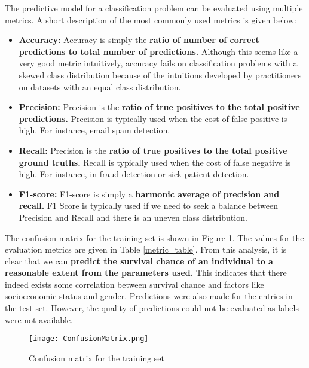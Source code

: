 \documentclass[conference]{IEEEtran}
\begin{document}
The predictive model for a classification problem can be evaluated using multiple metrics. A short description of the most commonly used metrics is given below:

\begin{itemize}
    \item \textbf{Accuracy:}
    Accuracy is simply the \textbf{ratio of number of correct predictions to total number of predictions.} Although this seems like a very good metric intuitively, accuracy fails on classification problems with a skewed class distribution because of the intuitions developed by practitioners on datasets with an equal class distribution.
    \item \textbf{Precision:}
    Precision is the \textbf{ratio of true positives to the total positive predictions.} Precision is typically used when the cost of false positive is high. For instance, email spam detection.
    \item \textbf{Recall:}
    Precision is the \textbf{ratio of true positives to the total positive ground truths.} Recall is typically used when the cost of false negative is high. For instance, in fraud detection or sick patient detection.
    \item \textbf{F1-score:}
    F1-score is simply a \textbf{harmonic average of precision and recall.} F1 Score is typically used if we need to seek a balance between Precision and Recall and there is an uneven class distribution.
    
    
\end{itemize}

The confusion matrix for the training set is shown in Figure \ref{ConfusionMatrix}. The values for the evaluation metrics are given in Table \ref{metric_table}. From this analysis, it is clear that we can \textbf{predict the survival chance of an individual to a reasonable extent from the parameters used.} This indicates that there indeed exists some correlation between survival chance and factors like socioeconomic status and gender. Predictions were also made for the entries in the test set. However, the quality of predictions could not be evaluated as labels were not available.

\begin{figure}[tbh]
\centering
\texttt{[image: ConfusionMatrix.png]}
\caption{Confusion matrix for the training set}
\label{ConfusionMatrix}
\end{figure}
\end{document}
